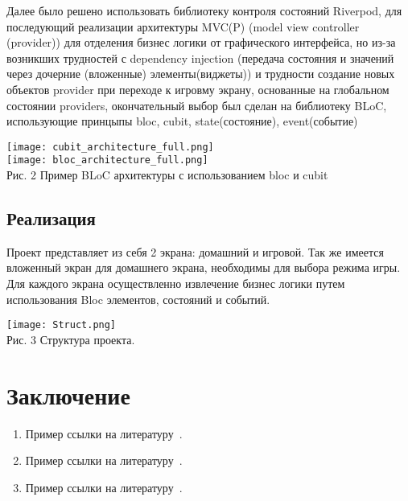 \documentclass[14pt, oneside]{altsu-report}
\begin{document}
Далее было решено использовать библиотеку контроля состояний Riverpod, для последующий реализации архитектуры MVC(P) (model view controller (provider)) для отделения бизнес логики от графического интерфейса, но из-за возникших трудностей с dependency injection (передача состояния и значений через дочерние (вложенные) элементы(виджеты)) и трудности создание новых объектов provider при переходе к игровму экрану, основанные на глобальном состоянии providers, окончательный выбор был сделан на библиотеку BLoC, использующие принцыпы bloc, cubit, state(состояние), event(событие)

\begin{center}
\texttt{[image: cubit\_architecture\_full.png]}\\
\vspace{20pt}
\texttt{[image: bloc\_architecture\_full.png]}\\
   
Рис. 2 Пример BLoC архитектуры с использованием bloc и cubit
\end{center}

\section{Реализация}
Проект представляет из себя 2 экрана: домашний и игровой. Так же имеется вложенный экран для домашнего экрана, необходимы для выбора режима игры.
Для каждого экрана осуществленно извлечение бизнес логики путем использования Bloc элементов, состояний и событий.

\newpage
\begin{center}
\texttt{[image: Struct.png]}\\
   
Рис. 3 Структура проекта. 
\end{center}

\chapter*{Заключение}

\begin{enumerate}
\item Пример ссылки на литературу~\cite{wikiRUBitbucket}.
\item Пример ссылки на литературу~\cite{wikiRUIdSoftware}.
\item Пример ссылки на литературу~\cite{wikiRUGitHub}.
\end{enumerate}
\end{document}

